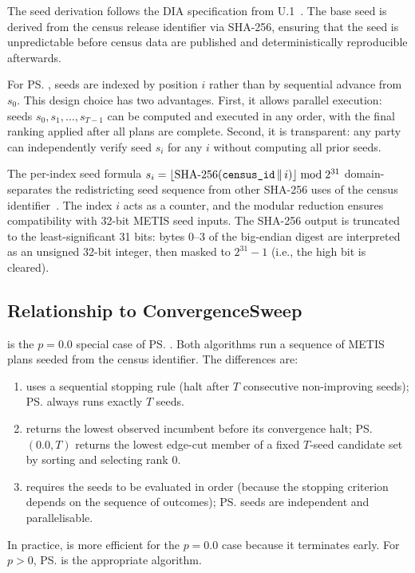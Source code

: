 The seed derivation follows the DIA specification from U.1~\citep{b16paper}.
The base seed is derived from the census release identifier via SHA-256,
ensuring that the seed is unpredictable before census data are published
and deterministically reproducible afterwards.

For \ps{}, seeds are indexed by position $i$ rather than by sequential
advance from $s_0$.
This design choice has two advantages.
First, it allows parallel execution: seeds $s_0, s_1, \ldots, s_{T-1}$
can be computed and executed in any order, with the final ranking applied
after all plans are complete.
Second, it is transparent: any party can independently verify seed $s_i$
for any $i$ without computing all prior seeds.

The per-index seed formula $s_i = \lfloor \text{SHA-256}(\texttt{census\_id}
\,\|\, i) \rfloor \bmod 2^{31}$ domain-separates the redistricting seed sequence
from other SHA-256 uses of the census identifier~\citep{sha256nist}.
The index $i$ acts as a counter, and the modular reduction ensures
compatibility with 32-bit METIS seed inputs.
The SHA-256 output is truncated to the least-significant 31 bits: bytes 0--3
of the big-endian digest are interpreted as an unsigned 32-bit integer, then
masked to $2^{31} - 1$ (i.e., the high bit is cleared).

\subsection{Relationship to ConvergenceSweep}

\cs{} is the $p = 0.0$ special case of \ps{}.
Both algorithms run a sequence of METIS plans seeded from the census
identifier.
The differences are:
\begin{enumerate}
\item \cs{} uses a sequential stopping rule (halt after $T$ consecutive
      non-improving seeds); \ps{} always runs exactly $T$ seeds.
\item \cs{} returns the lowest observed incumbent before its convergence halt;
      \ps{}$(0.0, T)$ returns the lowest edge-cut member of a fixed $T$-seed
      candidate set by sorting and selecting rank 0.
\item \cs{} requires the seeds to be evaluated in order (because the stopping
      criterion depends on the sequence of outcomes); \ps{} seeds are
      independent and parallelisable.
\end{enumerate}

In practice, \cs{} is more efficient for the $p = 0.0$ case because it
terminates early.
For $p > 0$, \ps{} is the appropriate algorithm.

